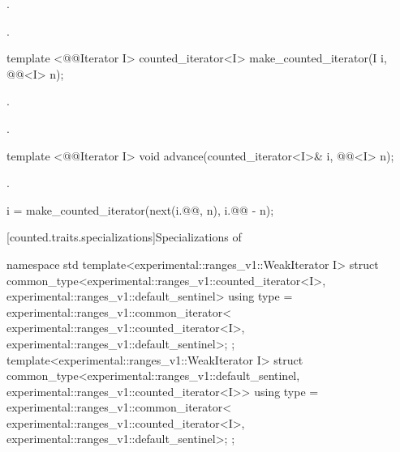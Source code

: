 \begin{addedblock}
\begin{itemdescr}
\pnum
\requires {}.

\pnum
\oldtxt{\returns}
.
\end{itemdescr}

%
\begin{itemdecl}
template <@@Iterator I>
  counted_iterator<I> make_counted_iterator(I i, @@<I> n);
\end{itemdecl}

\begin{itemdescr}
\pnum
\requires {}.

\pnum
\returns {}.
\end{itemdescr}

%
\begin{itemdecl}
template <@@Iterator I>
  void advance(counted_iterator<I>& i, @@<I> n);
\end{itemdecl}

\begin{itemdescr}
\pnum
\requires {}.

\pnum
\effects
\begin{codeblock}
i = make_counted_iterator(next(i.@@, n), i.@@ - n);
\end{codeblock}
\end{itemdescr}

{\color{oldclr}
[counted.traits.specializations]{Specializations of }

%
\begin{itemdecl}
namespace std {
  template<experimental::ranges_v1::WeakIterator I>
  struct common_type<experimental::ranges_v1::counted_iterator<I>,
                     experimental::ranges_v1::default_sentinel> {
    using type = experimental::ranges_v1::common_iterator<
      experimental::ranges_v1::counted_iterator<I>,
      experimental::ranges_v1::default_sentinel>;
  };
  template<experimental::ranges_v1::WeakIterator I>
  struct common_type<experimental::ranges_v1::default_sentinel,
                     experimental::ranges_v1::counted_iterator<I>> {
    using type = experimental::ranges_v1::common_iterator<
      experimental::ranges_v1::counted_iterator<I>,
      experimental::ranges_v1::default_sentinel>;
  };
}
\end{itemdecl}

}
\end{addedblock}
